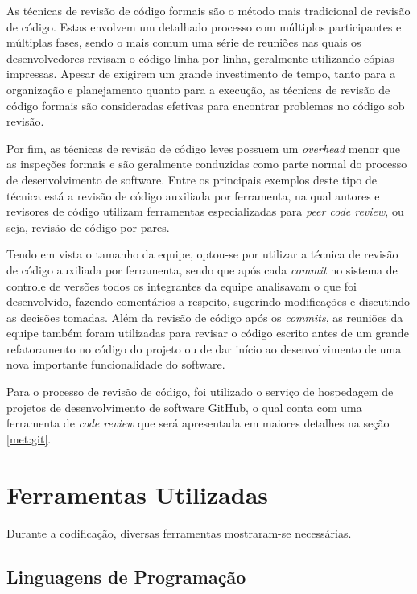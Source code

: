As técnicas de revisão de código formais são o método mais tradicional de revisão de código.
Estas envolvem um detalhado processo com múltiplos participantes e múltiplas fases, sendo o mais comum uma série de reuniões nas quais os desenvolvedores revisam o código linha por linha, geralmente utilizando cópias impressas.
Apesar de exigirem um grande investimento de tempo, tanto para a organização e planejamento quanto para a execução, as técnicas de revisão de código formais são consideradas efetivas para encontrar problemas no código sob revisão.

Por fim, as técnicas de revisão de código leves possuem um \emph{overhead} menor que as inspeções formais e são geralmente conduzidas como parte normal do processo de desenvolvimento de software.
Entre os principais exemplos deste tipo de técnica está a revisão de código auxiliada por ferramenta, na qual autores e revisores de código utilizam ferramentas especializadas para \emph{peer code review}, ou seja, revisão de código por pares.

Tendo em vista o tamanho da equipe, optou-se por utilizar a técnica de revisão de código auxiliada por ferramenta, sendo que após cada \emph{commit} no sistema de controle de versões todos os integrantes da equipe analisavam o que foi desenvolvido, fazendo comentários a respeito, sugerindo modificações e discutindo as decisões tomadas.
Além da revisão de código após os \emph{commits}, as reuniões da equipe também foram utilizadas para revisar o código escrito antes de um grande refatoramento no código do projeto ou de dar início ao desenvolvimento de uma nova importante funcionalidade do software.

Para o processo de revisão de código, foi utilizado o serviço de hospedagem de projetos de desenvolvimento de software GitHub, o qual conta com uma ferramenta de \emph{code review} que será apresentada em maiores detalhes na seção \ref{met:git}.


\section{Ferramentas Utilizadas}

Durante a codificação, diversas ferramentas mostraram-se necessárias.

\subsection{Linguagens de Programação}

